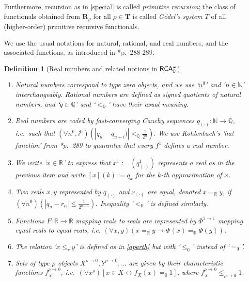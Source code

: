 \documentclass[reqno]{amsart}
\newtheorem{defi}[thm]{Definition}
\def\RCAo{\textup{\textsf{RCA}}_{0}^{\omega}}
\def\N{{\mathbb  N}}
\def\Q{{\mathbb  Q}}
\def\R{{\mathbb  R}}
\def\di{\rightarrow}
\def\asa{\leftrightarrow}
\numberwithin{equation}{section}
\numberwithin{thm}{section}
\begin{document}
\smallskip

Furthermore, recursion as in \eqref{special} is called \emph{primitive recursion}; the class of functionals obtained from $\mathbf{R}_{\rho}$ for all $\rho \in \mathbf{T}$ is called \emph{G\"odel's system $T$} of all (higher-order) primitive recursive functionals.  

\smallskip

We use the usual notations for natural, rational, and real numbers, and the associated functions, as introduced in \cite{kohlenbach2}*{p.\ 288-289}.  
\begin{defi}[Real numbers and related notions in $\RCAo$]\label{keepintireal}\rm~
\begin{enumerate}
\item Natural numbers correspond to type zero objects, and we use `$n^{0}$' and `$n\in \N$' interchangeably.  Rational numbers are defined as signed quotients of natural numbers, and `$q\in \Q$' and `$<_{\Q}$' have their usual meaning.    
\item Real numbers are coded by fast-converging Cauchy sequences $q_{(\cdot)}:\N\di \Q$, i.e.\  such that $(\forall n^{0}, i^{0})(|q_{n}-q_{n+i})|<_{\Q} \frac{1}{2^{n}})$.  
We use Kohlenbach's `hat function' from \cite{kohlenbach2}*{p.\ 289} to guarantee that every $f^{1}$ defines a real number.  
\item We write `$x\in \R$' to express that $x^{1}:=(q^{1}_{(\cdot)})$ represents a real as in the previous item and write $[x](k):=q_{k}$ for the $k$-th approximation of $x$.    
\item Two reals $x, y$ represented by $q_{(\cdot)}$ and $r_{(\cdot)}$ are \emph{equal}, denoted $x=_{\R}y$, if $(\forall n^{0})(|q_{n}-r_{n}|\leq \frac{1}{2^{n-1}})$. Inequality `$<_{\R}$' is defined similarly.         
\item Functions $F:\R\di \R$ mapping reals to reals are represented by $\Phi^{1\di 1}$ mapping equal reals to equal reals, i.e. $(\forall x, y)(x=_{\R}y\di \Phi(x)=_{\R}\Phi(y))$.
\item The relation `$x\leq_{\tau}y$' is defined as in \eqref{aparth} but with `$\leq_{0}$' instead of `$=_{0}$'.  
\item Sets of type $\rho$ objects $X^{\rho\di 0}, Y^{\rho\di 0}, \dots$ are given by their characteristic functions $f^{\rho\di 0}_{X}$, i.e.\ $(\forall x^{\rho})[x\in X\asa f_{X}(x)=_{0}1]$, where $f_{X}^{\rho\di 0}\leq_{\rho\di 0}1$.  
\end{enumerate}
\end{defi}
\end{document}
